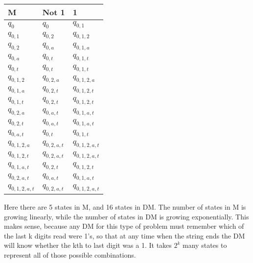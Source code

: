 \documentclass{article}
\begin{document}
\begin{enumerate}[(a)]
\begin{tabular}{l | l l}
M & Not 1 & 1 \\
\hline
$q_0$ & $q_0$ & $q_{0,1}$ \\
$q_{0,1}$ & $q_{0,2}$ & $q_{0,1,2}$ \\
$q_{0,2}$ & $q_{0,a}$ & $q_{0,1,a}$ \\
$q_{0,a}$ & $q_{0,t}$ & $q_{0,1,t}$ \\
$q_{0,t}$ & $q_{0,t}$ & $q_{0,1,t}$ \\
$q_{0,1,2}$ & $q_{0,2,a}$ & $q_{0,1,2,a}$ \\
$q_{0,1,a}$ & $q_{0,2,t}$ & $q_{0,1,2,t}$ \\
$q_{0,1,t}$ & $q_{0,2,t}$ & $q_{0,1,2,t}$ \\
$q_{0,2,a}$ & $q_{0,a,t}$ & $q_{0,1,a,t}$ \\
$q_{0,2,t}$ & $q_{0,a,t}$ & $q_{0,1,a,t}$ \\
$q_{0,a,t}$ & $q_{0,t}$ & $q_{0,1,t}$ \\
$q_{0,1,2,a}$ & $q_{0,2,a,t}$ & $q_{0,1,2,a,t}$ \\
$q_{0,1,2,t}$ & $q_{0,2,a,t}$ & $q_{0,1,2,a,t}$ \\
$q_{0,1,a,t}$ & $q_{0,2,t}$ & $q_{0,1,2,t}$ \\
$q_{0,2,a,t}$ & $q_{0,a,t}$ & $q_{0,1,a,t}$ \\
$q_{0,1,2,a,t}$ & $q_{0,2,a,t}$ & $q_{0,1,2,a,t}$ \\

\end{tabular}

\vspace{6em}

Here there are 5 states in M, and 16 states in DM. The number of states in M is
growing linearly, while the number of states in DM is growing exponentially.
This makes sense, because any DM for this type of problem must remember which of
the last k digits read were 1's, so that at any time when the string ends the
DM will know whether the kth to last digit was a 1. It takes $2^k$ many
states to represent all of those possible combinations.

\end{enumerate}
\end{document}
